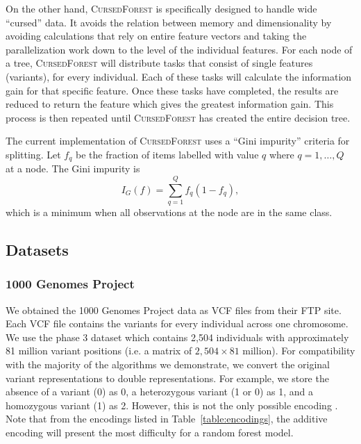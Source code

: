 \documentclass[10pt,letterpaper]{article}
\newcommand{\cursedforest}{\textsc{CursedForest}\xspace}
\begin{document}
On the other hand, \cursedforest is specifically designed to handle wide ``cursed'' data. It avoids the relation between
memory and dimensionality by avoiding calculations that rely on entire feature vectors and taking the parallelization
work down to the level of the individual features.  For each node of a tree, \cursedforest will distribute
tasks that consist of single features (variants), for every individual.  Each of these tasks will calculate the
information gain for that specific feature.  Once these tasks have completed, the results are reduced to return the
feature which gives the greatest information gain.  This process is then repeated until \cursedforest has created the
entire decision tree.

The current implementation of \cursedforest uses a ``Gini impurity'' criteria for splitting. Let $f_q$ be the fraction
of items labelled with value $q$ where $q = 1, \ldots, Q$ at a node. The Gini impurity is
$$
I_G(f) = \sum_{q = 1}^Q f_q ( 1 - f_q ), 
$$
which is a minimum when all observations at the node are in the same class.

\subsection{Datasets}
\subsubsection{1000 Genomes Project}
We obtained the 1000 Genomes Project data as VCF files from their FTP site.  Each VCF file contains the variants for
every individual across one chromosome.  We use the phase 3 dataset which contains 2,504 individuals with approximately
81 million variant positions (i.e. a matrix of $2,504 \times 81$ million).  For compatibility with the majority of the
algorithms we demonstrate, we convert the original variant representations to double representations.  For example, we
store the absence of a variant (0) as 0, a heterozygous
variant (1 or 0) as 1, and a
homozygous variant (1) as 2.  However, this is not the only possible encoding \cite{Goldstein.et.al.2011}. Note that from
the encodings listed in Table~\ref{table:encodings}, the additive encoding will present the most difficulty for a random
forest model.
\end{document}
